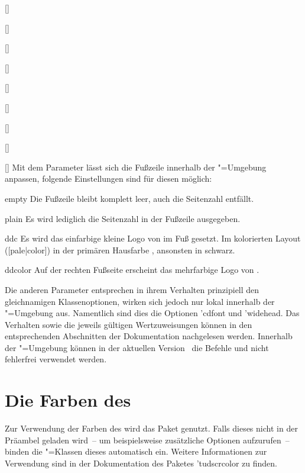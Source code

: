 \documentclass[%
  english,ngerman,%
  headings=optiontoheadandtoc,captions=tableheading,numbers=noenddot,%
  chapterpage,cdfoot,%
]{tudscrman}
\begin{document}
\begin{Declaration}{[]}
\begin{Declaration}{[]}
\begin{Declaration}{[\PSet]}
\begin{Declaration}{[]}
\begin{Declaration}{[]}
\begin{Declaration}{[\PBoolean]}
\begin{Declaration}{[\PSet]}
\begin{Declaration}{[\PSet]}
\begin{Declaration}{[]}
Mit dem Parameter  lässt sich die Fußzeile 
innerhalb der "=Umgebung anpassen, folgende Einstellungen 
sind für diesen möglich:
%
\begin{values}
\item[empty] Die Fußzeile bleibt komplett leer, auch die Seitenzahl entfällt.
\item[plain] Es wird lediglich die Seitenzahl in der Fußzeile ausgegeben.
\item[ddc] Es wird das einfarbige kleine Logo von \DDC im Fuß gesetzt. Im 
  kolorierten Layout ([pale|color]) in der primären Hausfarbe 
  , ansonsten in schwarz.
\item[ddcolor] Auf der rechten Fußseite erscheint das mehrfarbige Logo von \DDC.
\end{values}
%
Die anderen Parameter entsprechen in ihrem Verhalten prinzipiell den 
gleichnamigen Klassenoptionen, wirken sich jedoch nur lokal innerhalb der 
"=Umgebung aus. Namentlich sind dies die Optionen 
\Option'{cdfont} und \Option'{widehead}. Das Verhalten sowie die jeweils 
gültigen Wertzuweisungen können in den entsprechenden Abschnitten der 
Dokumentation nachgelesen werden.
%
\Attention Innerhalb der "=Umgebung können in der 
aktuellen Version~\vTUDScript{} die Befehle  und  
nicht fehlerfrei verwendet werden.
\end{Declaration}
\end{Declaration}
\end{Declaration}
\end{Declaration}
\end{Declaration}
\end{Declaration}
\end{Declaration}
\end{Declaration}
\end{Declaration}

\section{Die Farben des \CDs}
Zur Verwendung der Farben des \CDs wird das Paket  
genutzt. Falls dieses nicht in der Präambel geladen wird~-- um beispielsweise 
zusätzliche Optionen aufzurufen~-- binden die \TUDScript"=Klassen dieses 
automatisch ein. Weitere Informationen zur Verwendung sind in der Dokumentation 
des Paketes \Package*'{tudscrcolor} zu finden.
\end{document}
